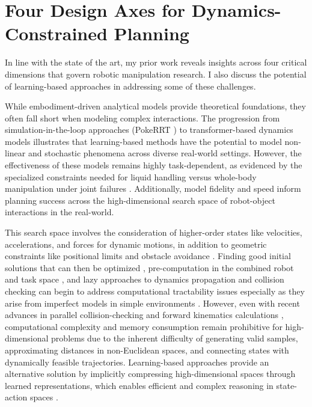 \section{Four Design Axes for Dynamics-Constrained Planning}

In line with the state of the art, my prior work reveals insights across four critical dimensions that govern robotic manipulation research. I also discuss the potential of learning-based approaches in addressing some of these challenges.

 While embodiment-driven analytical models provide theoretical foundations, they often fall short when modeling complex interactions. The progression from simulation-in-the-loop approaches (PokeRRT \cite{pasricha2022pokerrt}) to transformer-based dynamics models \cite{reed2024transformer} illustrates that learning-based methods have the potential to model non-linear and stochastic phenomena across diverse real-world settings. However, the effectiveness of these models remains highly task-dependent, as evidenced by the specialized constraints needed for liquid handling \cite{abderezaei2024clutter} versus whole-body manipulation under joint failures \cite{briscoe2024exploring}. Additionally, model fidelity and speed inform planning success across the high-dimensional search space of robot-object interactions in the real-world.

This search space involves the consideration of higher-order states like velocities, accelerations, and forces for dynamic motions, in addition to geometric constraints like positional limits and obstacle avoidance \cite{schmerling2019kinodynamic}. Finding good initial solutions that can then be optimized \cite{kuntz2019fast}, pre-computation in the combined robot and task space \cite{shome2021asymptotically,briscoe2024exploring}, and lazy approaches to dynamics propagation and collision checking \cite{pasricha2024virtues} can begin to address computational tractability issues especially as they arise from imperfect models in simple environments \cite{pasricha2022pokerrt,briscoe2024exploring,abderezaei2024clutter}.
However, even with recent advances in parallel collision-checking and forward kinematics calculations \cite{sundaralingam2023curobo,thomason2024motions}, computational complexity and memory consumption remain prohibitive for high-dimensional problems due to the inherent difficulty of generating valid samples, approximating distances in non-Euclidean spaces, and connecting states with dynamically feasible trajectories.
Learning-based approaches provide an alternative solution by implicitly compressing high-dimensional spaces through learned representations, which enables efficient and complex reasoning in state-action spaces \cite{qureshi2020motion}.

